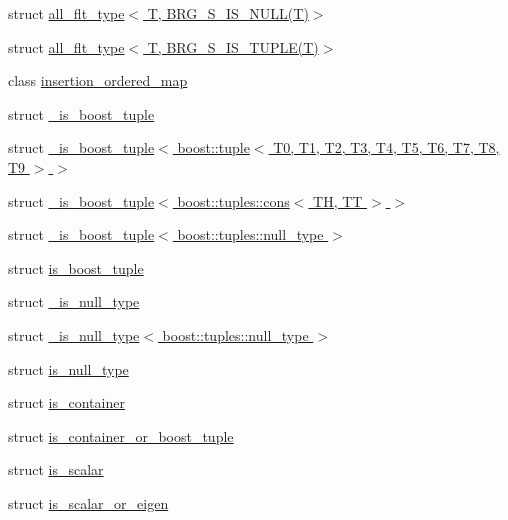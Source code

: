 \begin{DoxyCompactItemize}
\item 
struct \hyperlink{structIceBRG_1_1all__flt__type_3_01T_00_01BRG__S__IS__NULL_07T_08_4}{all\-\_\-flt\-\_\-type$<$ T, B\-R\-G\-\_\-\-S\-\_\-\-I\-S\-\_\-\-N\-U\-L\-L(\-T)$>$}
\item 
struct \hyperlink{structIceBRG_1_1all__flt__type_3_01T_00_01BRG__S__IS__TUPLE_07T_08_4}{all\-\_\-flt\-\_\-type$<$ T, B\-R\-G\-\_\-\-S\-\_\-\-I\-S\-\_\-\-T\-U\-P\-L\-E(\-T)$>$}
\item 
class \hyperlink{classIceBRG_1_1insertion__ordered__map}{insertion\-\_\-ordered\-\_\-map}
\item 
struct \hyperlink{structIceBRG_1_1__is__boost__tuple}{\-\_\-is\-\_\-boost\-\_\-tuple}
\item 
struct \hyperlink{namespaceIceBRG_structIceBRG_1_1__is__boost__tuple_3_01boost_1_1tuple_3_01T0_00_01T1_00_01T2_00_01T3_00_01T4_00_aeaacd25f11a77396b5b6e53a5953fba}{\-\_\-is\-\_\-boost\-\_\-tuple$<$ boost\-::tuple$<$ T0, T1, T2, T3, T4, T5, T6, T7, T8, T9 $>$ $>$}
\item 
struct \hyperlink{namespaceIceBRG_structIceBRG_1_1__is__boost__tuple_3_01boost_1_1tuples_1_1cons_3_01TH_00_01TT_01_4_01_4}{\-\_\-is\-\_\-boost\-\_\-tuple$<$ boost\-::tuples\-::cons$<$ T\-H, T\-T $>$ $>$}
\item 
struct \hyperlink{namespaceIceBRG_structIceBRG_1_1__is__boost__tuple_3_01boost_1_1tuples_1_1null__type_01_4}{\-\_\-is\-\_\-boost\-\_\-tuple$<$ boost\-::tuples\-::null\-\_\-type $>$}
\item 
struct \hyperlink{structIceBRG_1_1is__boost__tuple}{is\-\_\-boost\-\_\-tuple}
\item 
struct \hyperlink{structIceBRG_1_1__is__null__type}{\-\_\-is\-\_\-null\-\_\-type}
\item 
struct \hyperlink{namespaceIceBRG_structIceBRG_1_1__is__null__type_3_01boost_1_1tuples_1_1null__type_01_4}{\-\_\-is\-\_\-null\-\_\-type$<$ boost\-::tuples\-::null\-\_\-type $>$}
\item 
struct \hyperlink{structIceBRG_1_1is__null__type}{is\-\_\-null\-\_\-type}
\item 
struct \hyperlink{namespaceIceBRG_structIceBRG_1_1is__container}{is\-\_\-container}
\item 
struct \hyperlink{namespaceIceBRG_structIceBRG_1_1is__container__or__boost__tuple}{is\-\_\-container\-\_\-or\-\_\-boost\-\_\-tuple}
\item 
struct \hyperlink{namespaceIceBRG_structIceBRG_1_1is__scalar}{is\-\_\-scalar}
\item 
struct \hyperlink{namespaceIceBRG_structIceBRG_1_1is__scalar__or__eigen}{is\-\_\-scalar\-\_\-or\-\_\-eigen}

\end{DoxyCompactItemize}
